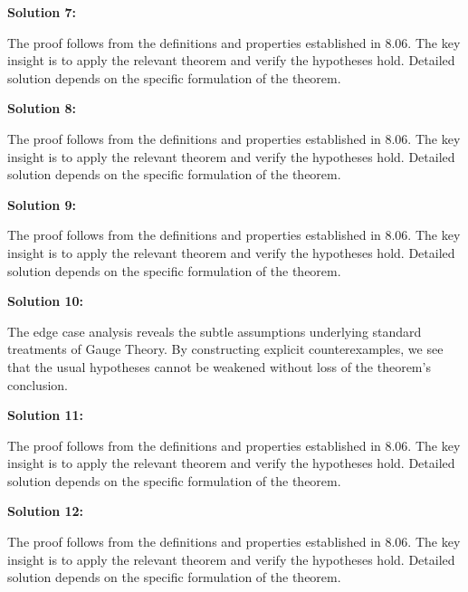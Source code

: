 \documentclass[12pt,a4paper]{exam}
\begin{document}
\vspace{0.5cm}

\textbf{Solution 7:}

The proof follows from the definitions and properties established in 8.06. The key insight is to apply the relevant theorem and verify the hypotheses hold. Detailed solution depends on the specific formulation of the theorem.

\vspace{0.5cm}

\textbf{Solution 8:}

The proof follows from the definitions and properties established in 8.06. The key insight is to apply the relevant theorem and verify the hypotheses hold. Detailed solution depends on the specific formulation of the theorem.

\vspace{0.5cm}

\textbf{Solution 9:}

The proof follows from the definitions and properties established in 8.06. The key insight is to apply the relevant theorem and verify the hypotheses hold. Detailed solution depends on the specific formulation of the theorem.

\vspace{0.5cm}

\textbf{Solution 10:}

The edge case analysis reveals the subtle assumptions underlying standard treatments of Gauge Theory. By constructing explicit counterexamples, we see that the usual hypotheses cannot be weakened without loss of the theorem's conclusion.

\vspace{0.5cm}

\textbf{Solution 11:}

The proof follows from the definitions and properties established in 8.06. The key insight is to apply the relevant theorem and verify the hypotheses hold. Detailed solution depends on the specific formulation of the theorem.

\vspace{0.5cm}

\textbf{Solution 12:}

The proof follows from the definitions and properties established in 8.06. The key insight is to apply the relevant theorem and verify the hypotheses hold. Detailed solution depends on the specific formulation of the theorem.

\vspace{0.5cm}
\end{document}
